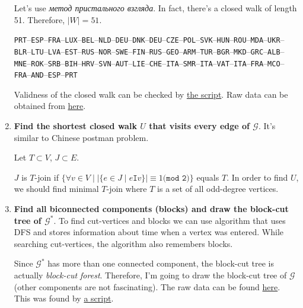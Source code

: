 \documentclass[12pt, a4paper]{article}
\newcommand\EGraph{\mathcal{G}^{*}}
\newcommand\EGraphL{\mathcal{G}}
\begin{document}
\begin{enumerate}[label=\alph*)]
Let's use \textit{\textrussian{метод пристального взгляда}}.
In fact, there's a closed walk of length 51. Therefore, \(|W| = 51\).

\texttt{PRT}--\texttt{ESP}--\texttt{FRA}--\texttt{LUX}--\texttt{BEL}--\texttt{NLD}--\texttt{DEU}--\texttt{DNK}--\texttt{DEU}--\texttt{CZE}--\texttt{POL}--\texttt{SVK}--\texttt{HUN}--\texttt{ROU}--\texttt{MDA}--\texttt{UKR}--\texttt{BLR}--\texttt{LTU}--\texttt{LVA}--\texttt{EST}--\texttt{RUS}--\texttt{NOR}--\texttt{SWE}--\texttt{FIN}--\texttt{RUS}--\texttt{GEO}--\texttt{ARM}--\texttt{TUR}--\texttt{BGR}--\texttt{MKD}--\texttt{GRC}--\texttt{ALB}--\texttt{MNE}--\texttt{ROK}--\texttt{SRB}--\texttt{BIH}--\texttt{HRV}--\texttt{SVN}--\texttt{AUT}--\texttt{LIE}--\texttt{CHE}--\texttt{ITA}--\texttt{SMR}--\texttt{ITA}--\texttt{VAT}--\texttt{ITA}--\texttt{FRA}--\texttt{MCO}--\texttt{FRA}--\texttt{AND}--\texttt{ESP}--\texttt{PRT}

Validness of the closed walk can be checked by \href{https://github.com/ablearthy-itmo-39828cf299f04949c86/discrete-math-2-hw-1/blob/2be1a5d/auto/validate_closed_walk.py}{the script}.
Raw data can be obtained from \href{https://github.com/ablearthy-itmo-39828cf299f04949c86/discrete-math-2-hw-1/blob/fc8406d/data/vertex_closed_walk.txt}{here}.

\item \textbf{Find the shortest closed walk \(U\) that visits every edge of
\(\EGraphL\)}.
It's similar to Chinese postman problem.

Let \(T \subset V\), \(J \subset E\).

\(J\) is \(T\)-join if
\(\{\forall v \in V \mid |\{ e \in J \mid e \texttt{I} v\}| \equiv 1 \texttt{(mod 2)}\}\)
equals \(T\).
In order to find \(U\), we should find minimal \(T\)-join where \(T\) is a set of all
odd-degree vertices.

\item \textbf{Find all biconnected components (blocks) and draw the block-cut tree of \(\EGraph\)}.
To find cut-vertices and blocks we can use algorithm that uses DFS and stores
information about time when a vertex was entered. While searching cut-vertices,
the algorithm also remembers blocks.

Since \(\EGraph\) has more than one connected component, the block-cut tree is
actually \textit{block-cut forest}. Therefore, I'm going to draw the block-cut
tree of \(\EGraphL\) (other components are not fascinating). The raw data can be
found
\href{https://github.com/ablearthy-itmo-39828cf299f04949c86/discrete-math-2-hw-1/blob/6363b0f/data/biconnected_components.txt}{here}.
This was found by
\href{https://github.com/ablearthy-itmo-39828cf299f04949c86/discrete-math-2-hw-1/blob/c81b421/auto/biconnected_components.py}{a script}.


\end{enumerate}
\end{document}
